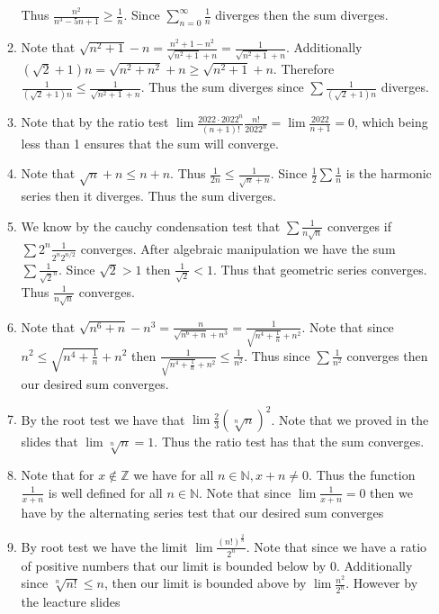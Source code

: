 \documentclass[12pt, letterpaper]{article}
\newcommand{\Z}{\mathbb{Z}}
\newcommand{\N}{\mathbb{N}}
\begin{document}
\begin{enumerate}
\begin{enumerate}
		Thus $\frac{n^2}{n^3-5n+1}\geq \frac{1}{n}$.  Since $\sum_{n=0}^\infty \frac{1}{n}$ diverges then the sum diverges.
		\item Note that $\sqrt{n^2 + 1} - n = \frac{n^2 + 1 - n^2}{\sqrt{n^2 + 1} + n} = \frac{1}{\sqrt{n^2 + 1} + n}$.  Additionally $(\sqrt{2}+1)n = \sqrt{n^2 + n^2} + n \geq \sqrt{n^2+1}+n$.
		Therefore $\frac{1}{(\sqrt{2}+1)n} \leq \frac{1}{\sqrt{n^2 + 1} + n}$.
		Thus the sum diverges since $\sum \frac{1}{(\sqrt{2}+1)n}$ diverges.
		\item Note that by the ratio test $\lim \frac{2022 \cdot 2022^n}{(n+1)!} \frac{n!}{2022^n} = \lim \frac{2022}{n+1} = 0$, which being less than 1 ensures
		that the sum will converge.  
		\item Note that $\sqrt{n} + n \leq n + n$.  Thus 
		$\frac{1}{2n} \leq \frac{1}{\sqrt{n} + n}$.  Since $\frac{1}{2}\sum \frac{1}{n}$ is the harmonic series then it diverges.  Thus the sum diverges.  
		\item We know by the cauchy condensation test that $\sum \frac{1}{n\sqrt{n}}$
		converges if $\sum 2^n \frac{1}{2^n 2^{n/2}}$ converges.  After 
		algebraic manipulation we have the sum $\sum \frac{1}{\sqrt{2}^n}$.  Since
		$\sqrt{2} > 1$ then $\frac{1}{\sqrt{2}} < 1$.  Thus that geometric series 
		converges.  Thus $\frac{1}{n \sqrt{n}}$ converges.  
		\item Note that $\sqrt{n^6 + n} - n^3 = \frac{n}{\sqrt{n^6 + n} + n^3} = 
		\frac{1}{\sqrt{n^4 + \frac{1}{n}} + n^2}$.  Note that since 
		$n^2 \leq \sqrt{n^4 + \frac{1}{n}} + n^2$ then $\frac{1}{\sqrt{n^4 + \frac{1}{n}} + n^2} \leq \frac{1}{n^2}$.  Thus since $\sum \frac{1}{n^2}$ converges
		then our desired sum converges. 
		\item By the root test we have that $\lim \frac{2}{3}(\sqrt[n]{n})^2$.  
		Note that we proved in the slides that $\lim \sqrt[n]{n} = 1$.  Thus 
		the ratio test has that the sum converges.  
		\item Note that for $x \not \in \Z$ we have for all $n \in \N, x + n \neq 0$.  Thus the function $\frac{1}{x+n}$ is well defined for all $n \in \N$.  
		Note that since $\lim \frac{1}{x+n} = 0$ then we have by the alternating 
		series test that our desired sum converges
		\item By root test we have the limit $\lim \frac{(n!)^{\frac{2}{n}}}{2^n}$.  Note that since we have a ratio of positive numbers that our limit is bounded 
		below by 0.  Additionally since $\sqrt[n]{n!}\leq n$, then our limit is 
		bounded above by $\lim \frac{n^2}{2^n}$.  However by the leacture slides 

\end{enumerate}
\end{enumerate}
\end{document}
